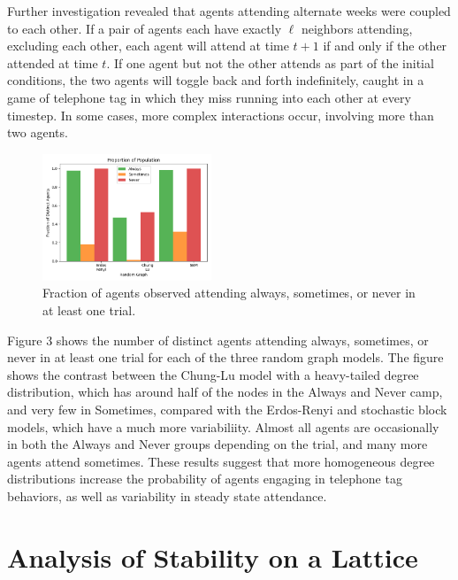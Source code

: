 \documentclass[12pt]{article}
\begin{document}
Further investigation revealed that agents attending alternate weeks were coupled to each other.  If a pair of agents each have exactly $\ell$ neighbors attending, excluding each other, each agent will attend at time $t+1$ if and only if the other attended at time $t$.  If one agent but not the other attends as part of the initial conditions, the two agents will toggle back and forth indefinitely, caught in a game of telephone tag in which they miss running into each other at every timestep.  In some cases, more complex interactions occur, involving more than two agents.

\begin{figure}[h!]
\includegraphics[width=0.45\textwidth]{always_sometimes_never.png}
\caption{Fraction of agents observed attending always, sometimes, or never in at least one trial.}
\end{figure}

Figure 3 shows the number of distinct agents attending always, sometimes, or never in at least one trial for each of the three random graph models.  The figure shows the contrast between the Chung-Lu model with a heavy-tailed degree distribution, which has around half of the nodes in the Always and Never camp, and very few in Sometimes, compared with the Erdos-Renyi and stochastic block models, which have a much more variabiliity.  Almost all agents are occasionally in both the Always and Never groups depending on the trial, and many more agents attend sometimes.  These results suggest that more homogeneous degree distributions increase the probability of agents engaging in telephone tag behaviors, as well as variability in steady state attendance.

\section{Analysis of Stability on a Lattice}
\end{document}
